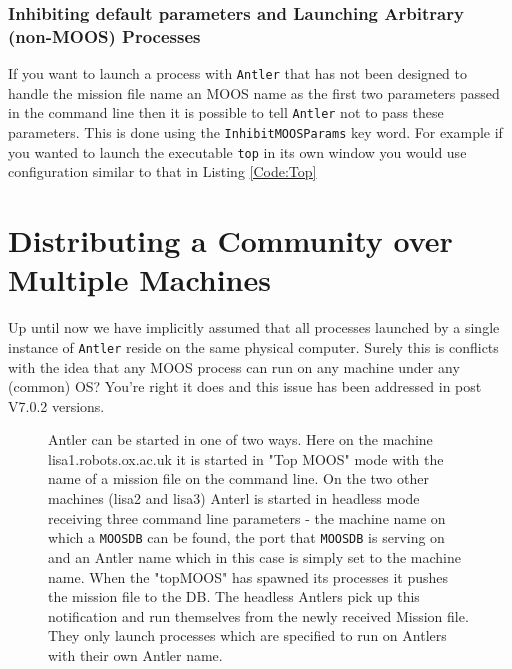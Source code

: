 \documentclass[a4paper,10pt]{article}
\newcommand{\Code}[1]{\texttt{#1} }
\newcommand{\code}[1]{\Code{#1} }
\begin{document}
\subsubsection{Inhibiting default parameters and Launching Arbitrary (non-MOOS) Processes}

If you want to launch a process with \code{Antler} that has not been designed to handle the mission file name an MOOS name as the first two parameters passed in the command line then it is possible to tell \code{Antler} not to pass these parameters. This is done using the \code{InhibitMOOSParams}  key word. For example if you wanted to launch the executable \code{top} in its own window you would use configuration similar to that in Listing \ref{Code:Top}


 


\section{Distributing  a Community over Multiple Machines}

Up until now we have implicitly assumed that all processes launched by a single instance of \code{Antler} reside on the same physical computer. Surely this is conflicts with the idea that any MOOS process can run on any machine under any (common) OS? You're right it does and this issue has been addressed in post V7.0.2 versions.

\begin{figure}
\centering
{}
\caption{Antler can be started in one of two ways. Here on the machine lisa1.robots.ox.ac.uk it is started  in "Top MOOS" mode with the name of a mission file on the command line. On the two other machines (lisa2 and lisa3) Anterl is started in headless mode receiving three command line parameters - the machine name on which a \code{MOOSDB} can be found, the port that \code{MOOSDB} is serving on and an Antler name which in this case is simply set to the machine name. When the "topMOOS" has spawned its processes it pushes the mission file to the DB. The headless Antlers pick up this notification and run themselves from the newly received Mission file. They only launch processes which are specified to run on Antlers with their own Antler name.} 
\end{figure}
\end{document}
